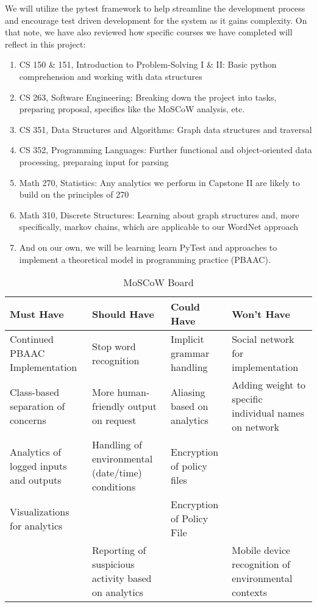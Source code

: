 \documentclass[12pt]{article}
\begin{document}
We will utilize the pytest framework to help streamline the development process and encourage test driven development for the system as it gains complexity. On that note, we have also reviewed how specific courses we have completed will reflect in this project:
\begin{enumerate}
    \item CS 150 \& 151, Introduction to Problem-Solving I \& II: Basic python comprehension and working with data structures
    \item CS 263, Software Engineering: Breaking down the project into tasks, preparing proposal, specifics like the MoSCoW analysis, etc.
    \item CS 351, Data Structures and Algorithms: Graph data structures and traversal
    \item CS 352, Programming Languages: Further functional and object-oriented data processing, preparaing input for parsing
    \item Math 270, Statistics: Any analytics we perform in Capstone II are likely to build on the principles of 270
    \item Math 310, Discrete Structures: Learning about graph structures and, more specifically, markov chains, which are applicable to our WordNet approach
    \item And on our own, we will be learning learn PyTest and approaches to implement a theoretical model in programming practice (PBAAC).
\end{enumerate}

\begin{table}[p]
    \begin{center}
        \begin{tabular}{ | m{1.3in} | m{1.3in}| m{1.3in} | m{1.3in} | } 
        \hline
        Must Have & Should Have & Could Have & Won't Have \\ 
        \hline
        \hline
        Continued PBAAC Implementation & Stop word recognition & Implicit grammar handling & Social network for implementation \\ 
        \hline
        Class-based separation of concerns & More human-friendly output on request & Aliasing based on analytics & Adding weight to specific individual names on network  \\ 
        \hline
        Analytics of logged inputs and outputs & Handling of environmental (date/time) conditions & Encryption of policy files & \\ 
        \hline
        Visualizations for analytics  &   & Encryption of Policy File &   \\ 
        \hline
          &  Reporting of suspicious activity based on analytics & & Mobile device recognition of environmental contexts  \\ 
        \hline
        \end{tabular}
        \caption{MoSCoW Board}
        \label{table:1}
    \end{center}
\end{table}
\end{document}
